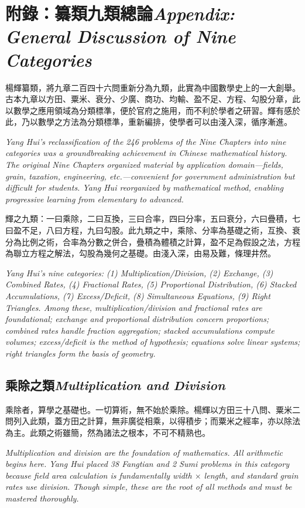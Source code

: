 \documentclass[10pt,a4paper]{article}
\newcommand{\bilingual}[2]{%
  \par\smallskip\noindent
  \begin{minipage}[t]{0.48\textwidth}
    \setlength{\parindent}{0pt}
    \setlength{\parskip}{4pt plus 1pt minus 1pt}
    #1
  \end{minipage}%
  \hfill
  \begin{minipage}[t]{0.48\textwidth}
    \setlength{\parindent}{0pt}
    \setlength{\parskip}{4pt plus 1pt minus 1pt}
    \small\textit{#2}%
  \end{minipage}
  \par\smallskip
}
\begin{document}
\newpage
\section*{附錄：纂類九類總論\hfill\textnormal{\small\textit{Appendix: General Discussion of Nine Categories}}}

\bilingual{%
楊輝纂類，將九章二百四十六問重新分為九類，此實為中國數學史上的一大創舉。古本九章以方田、粟米、衰分、少廣、商功、均輸、盈不足、方程、勾股分章，此以數學之應用領域為分類標準，便於官府之施用，而不利於學者之研習。輝有感於此，乃以數學之方法為分類標準，重新編排，使學者可以由淺入深，循序漸進。
}{%
Yang Hui's reclassification of the 246 problems of the \textit{Nine Chapters} into nine categories was a groundbreaking achievement in Chinese mathematical history. The original \textit{Nine Chapters} organized material by application domain---fields, grain, taxation, engineering, etc.---convenient for government administration but difficult for students. Yang Hui reorganized by \textit{mathematical method}, enabling progressive learning from elementary to advanced.
}

\bilingual{%
輝之九類：一曰乘除，二曰互換，三曰合率，四曰分率，五曰衰分，六曰疊積，七曰盈不足，八曰方程，九曰勾股。此九類之中，乘除、分率為基礎之術，互換、衰分為比例之術，合率為分數之併合，疊積為體積之計算，盈不足為假設之法，方程為聯立方程之解法，勾股為幾何之基礎。由淺入深，由易及難，條理井然。
}{%
Yang Hui's nine categories: (1) Multiplication/Division, (2) Exchange, (3) Combined Rates, (4) Fractional Rates, (5) Proportional Distribution, (6) Stacked Accumulations, (7) Excess/Deficit, (8) Simultaneous Equations, (9) Right Triangles. Among these, multiplication/division and fractional rates are foundational; exchange and proportional distribution concern proportions; combined rates handle fraction aggregation; stacked accumulations compute volumes; excess/deficit is the method of hypothesis; equations solve linear systems; right triangles form the basis of geometry.
}

\subsection*{乘除之類\hfill\textnormal{\small\textit{Multiplication and Division}}}

\bilingual{%
乘除者，算學之基礎也。一切算術，無不始於乘除。楊輝以方田三十八問、粟米二問列入此類，蓋方田之計算，無非廣從相乘，以得積步；而粟米之經率，亦以除法為主。此類之術雖簡，然為諸法之根本，不可不精熟也。
}{%
Multiplication and division are the foundation of mathematics. All arithmetic begins here. Yang Hui placed 38 Fangtian and 2 Sumi problems in this category because field area calculation is fundamentally width $\times$ length, and standard grain rates use division. Though simple, these are the root of all methods and must be mastered thoroughly.
}
\end{document}
